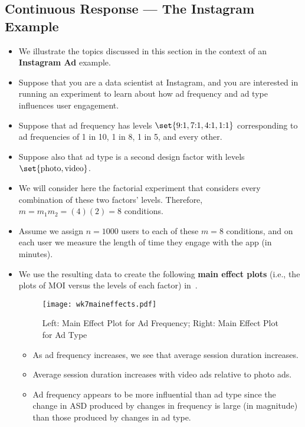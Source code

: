 \subsection{Continuous Response --- The Instagram Example}
\begin{itemize}
      \item We illustrate the topics discussed in this section in the context of an \textbf{Instagram Ad} example.
      \item Suppose that you are a data scientist at Instagram, and you are interested in running an experiment
            to learn about how ad frequency and ad type influences user engagement.
      \item Suppose that ad frequency has levels $ \set{\text{9:1},\text{7:1},\text{4:1},\text{1:1}} $ corresponding to ad frequencies of
            1 in 10, 1 in 8, 1 in 5, and every other.
      \item Suppose also that ad type is a second design factor with levels $ \set{\text{photo},\text{video}} $.
      \item We will consider here the factorial experiment that considers every combination of these two factors'
            levels. Therefore, $ m=m_1m_2=(4)(2)=8 $ conditions.
      \item Assume we assign $ n=1000 $ users to each of these $ m=8 $ conditions, and on each user we measure
            the length of time they engage with the app (in minutes).
      \item We use the resulting data to create the following \textbf{main effect plots} (i.e., the plots of MOI versus
            the levels of each factor) in~.
            \begin{figure}[!htbp]
                  \centering
                  \texttt{[image: wk7maineffects.pdf]}
                  \caption{Left: Main Effect Plot for Ad Frequency; Right: Main Effect Plot for Ad Type}\label{wk7eff}
            \end{figure}
            \begin{itemize}
                  \item As ad frequency increases, we see that average session duration increases.
                  \item Average session duration increases with video ads relative to photo ads.
                  \item Ad frequency appears to be more influential than ad type since the change in ASD produced by changes in frequency
                        is large (in magnitude) than those produced by changes in ad type.

\end{itemize}
\end{itemize}
